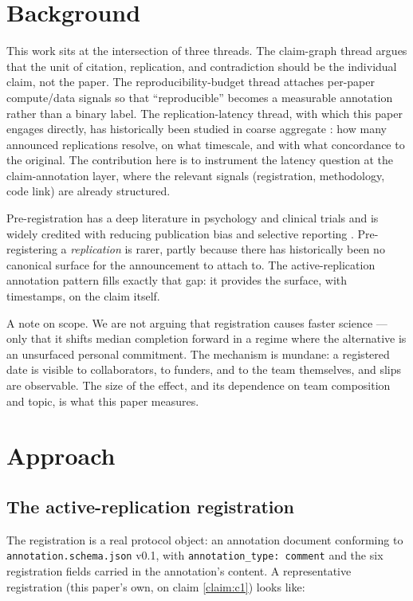 \documentclass{rrxiv}
\begin{document}
\section{Background}
\label{sec:background}
This work sits at the intersection of three threads. The claim-graph thread \citep[\texttt{rrxiv:2605.00002}]{rrxiv-claimgraph} argues that the unit of citation, replication, and contradiction should be the individual claim, not the paper. The reproducibility-budget thread \citep[\texttt{rrxiv:2605.00003}]{rrxiv-repro-budgets} attaches per-paper compute/data signals so that ``reproducible'' becomes a measurable annotation rather than a binary label. The replication-latency thread, with which this paper engages directly, has historically been studied in coarse aggregate \citep{camerer-2018,errington-2021}: how many announced replications resolve, on what timescale, and with what concordance to the original. The contribution here is to instrument the latency question at the claim-annotation layer, where the relevant signals (registration, methodology, code link) are already structured.

Pre-registration has a deep literature in psychology and clinical trials and is widely credited with reducing publication bias and selective reporting \citep{nosek-2018}. Pre-registering a \emph{replication} is rarer, partly because there has historically been no canonical surface for the announcement to attach to. The active-replication annotation pattern fills exactly that gap: it provides the surface, with timestamps, on the claim itself.

A note on scope. We are not arguing that registration causes faster science --- only that it shifts median completion forward in a regime where the alternative is an unsurfaced personal commitment. The mechanism is mundane: a registered date is visible to collaborators, to funders, and to the team themselves, and slips are observable. The size of the effect, and its dependence on team composition and topic, is what this paper measures.

\section{Approach}
\label{sec:approach}
\subsection{The active-replication registration}
\label{sec:registration-shape}
The registration is a real protocol object: an annotation document conforming to \texttt{annotation.schema.json} v0.1, with \texttt{annotation\_type: comment} and the six registration fields carried in the annotation's content. A representative registration (this paper's own, on claim \ref{claim:c1}) looks like:
\end{document}
